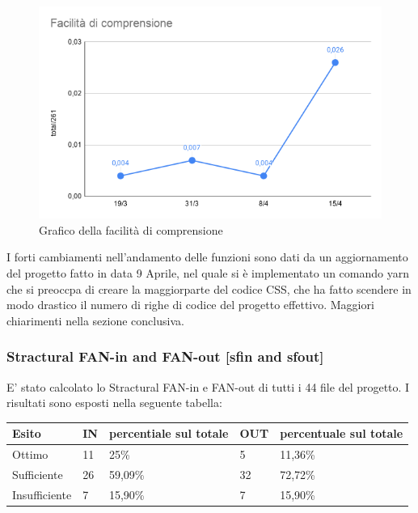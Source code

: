    \begin{figure}[H]
        \centering
        \includegraphics[width=10 cm]{source/sections/images/facilita_comprensione.png}
        \caption{Grafico della facilità di comprensione}
    \end{figure}

    I forti cambiamenti nell'andamento delle funzioni sono dati da un aggiornamento del progetto fatto in data
    9 Aprile, nel quale si è implementato un comando yarn che si preoccpa di creare la maggiorparte del
    codice CSS, che ha fatto scendere in modo drastico il numero di righe di codice del progetto effettivo. Maggiori chiarimenti nella sezione conclusiva.
\newpage
\subsubsection{Stractural FAN-in and FAN-out  [sfin and sfout]}
    E' stato calcolato lo Stractural FAN-in e FAN-out di tutti i 44 file del progetto. I risultati sono esposti nella seguente tabella:

    \begin{longtabu} to \textwidth {| X[0.1,c m] | X[0.1,c m] | X[0.1,c m] | X[0.1,c m] | X[0.1,c m] |}
        \hline
        \textbf{Esito} &
        \textbf{IN} &
        \textbf{percentiale sul totale} &
        \textbf{OUT} &
        \textbf{percentuale sul totale} \\
        \hline
        Ottimo & 11 & 25\% & 5 & 11,36\% \\ 
        \hline
        Sufficiente & 26 & 59,09\% & 32 & 72,72\% \\ 
        \hline
        Insufficiente & 7 & 15,90\% & 7 & 15,90\% \\ 
        \hline

        \end{longtabu}

